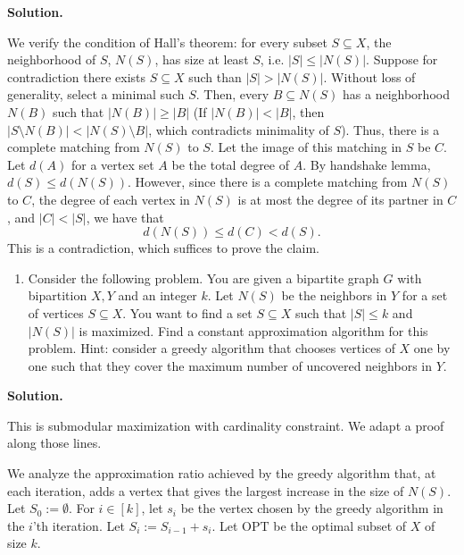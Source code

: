 \documentclass[11pt,letterpaper]{article}
\theoremstyle{definition}
\newcommand{\OPT}{\mathrm{OPT}}
\newcommand{\solution}{\medskip\noindent\textbf{Solution.}\par\medskip}
\begin{document}
\solution
We verify the condition of Hall's theorem: for every subset $S\subseteq X$, the neighborhood of $S$, $N(S)$, has size at least $S$, i.e. $|S|\leq |N(S)|$.
Suppose for contradiction there exists $S\subseteq X$ such than $|S|>|N(S)|$.
Without loss of generality, select a minimal such $S$.
Then, every $B\subseteq N(S)$ has a neighborhood $N(B)$ such that $|N(B)|\geq |B|$ (If $|N(B)|<|B|$, then $|S\setminus N(B)|<|N(S)\setminus B|$, which contradicts minimality of $S$). 
Thus, there is a complete matching from $N(S)$ to $S$.
Let the image of this matching in $S$ be $C$.
Let $d(A)$ for a vertex set $A$ be the total degree of $A$.
By handshake lemma, $d(S) \leq d(N(S))$.
However, since there is a complete matching from $N(S)$ to $C$, the degree of each vertex in $N(S)$ is at most the degree of its partner in $C$, and $|C|<|S|$, we have that
\[
d(N(S)) \leq d(C) < d(S).
\]
This is a contradiction, which suffices to prove the claim.


\begin{enumerate}[resume=q]
\item Consider the following problem. You are given a bipartite graph $G$ with bipartition $X, Y$ and an integer $k$. Let $N(S)$ be the neighbors in $Y$ for a set of vertices $S \subseteq X$. You want to find a set $S \subseteq X$ such that $|S| \leq k$ and $|N(S)|$ is maximized. Find a constant approximation algorithm for this problem. Hint: consider a greedy algorithm that chooses vertices of $X$ one by one such that they cover the maximum number of uncovered neighbors in $Y$.
\end{enumerate}

\solution
This is submodular maximization with cardinality constraint. We adapt a proof along those lines.

We analyze the approximation ratio achieved by the greedy algorithm that, at each iteration, adds a vertex that gives the largest increase in the size of $N(S)$.
Let $S_0:=\emptyset$.
For $i\in [k]$, let $s_i$ be the vertex chosen by the greedy algorithm in the $i$'th iteration.
Let $S_i:= S_{i-1} + s_i$.
Let $\OPT$ be the optimal subset of $X$ of size $k$.
\end{document}
